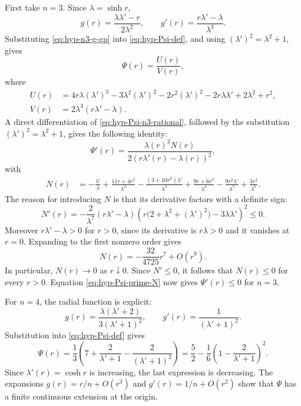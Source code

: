 \documentclass[11pt,reqno]{amsart}
\numberwithin{equation}{section}
\theoremstyle{definition}
\begin{document}
First take $n=3$.  Since $\lambda=\sinh r$,
\begin{equation}\label{eq:hyp-n3-g-gp}
    g(r)=\frac{\lambda\lambda'-r}{2\lambda^2},
    \qquad
    g'(r)=\frac{r\lambda'-\lambda}{\lambda^3}.
\end{equation}
Substituting \eqref{eq:hyp-n3-g-gp} into \eqref{eq:hyp-Psi-def}, and using $(\lambda')^2=\lambda^2+1$, gives
\begin{equation}\label{eq:hyp-Psi-n3-rational}
    \Psi(r)=\frac{U(r)}{V(r)},
\end{equation}
where
\begin{align*}
    U(r)&=4r\lambda(\lambda')^3-3\lambda^2(\lambda')^2
          -2r^2(\lambda')^2-2r\lambda\lambda'+2\lambda^2+r^2,
          \\
    V(r)&=2\lambda^3(r\lambda'-\lambda).
\end{align*}
A direct differentiation of \eqref{eq:hyp-Psi-n3-rational}, followed by the substitution $(\lambda')^2=\lambda^2+1$, gives the following identity:
\begin{equation}\label{eq:hyp-Psi-prime-N}
    \Psi'(r)=\frac{\lambda(r)^2N(r)}{2(r\lambda'(r)-\lambda(r))^2},
\end{equation}
with
\begin{align*}
    N(r)&=-\frac{\lambda'}{\lambda}
       +\frac{11r+4r^3}{\lambda^2}
       -\frac{(3+10r^2)\lambda'}{\lambda^3}
       +\frac{9r+6r^3}{\lambda^4}
       -\frac{9r^2\lambda'}{\lambda^5}
       +\frac{3r^3}{\lambda^6}.
\end{align*}
The reason for introducing $N$ is that its derivative factors with a definite sign:
\begin{equation*}
    N'(r)=
    -\frac{2}{\lambda^7}(r\lambda'-\lambda)
      \left(r\bigl(2+\lambda^2+(\lambda')^2\bigr)-3\lambda\lambda'\right)^2
      \leq0.
\end{equation*}
Moreover $r\lambda'-\lambda>0$ for $r>0$, since its derivative is $r\lambda>0$ and it vanishes at $r=0$.  Expanding to the first nonzero order gives
\begin{equation*}
    N(r)=-\frac{32}{4725}r^7+O(r^9).
\end{equation*}
In particular, $N(r)\to0$ as $r\downarrow0$.  Since $N'\leq0$, it follows that $N(r)\leq0$ for every $r>0$.  Equation \eqref{eq:hyp-Psi-prime-N} now gives $\Psi'(r)\leq0$ for $n=3$.

For $n=4$, the radial function is explicit:
\begin{equation*}
    g(r)=\frac{\lambda(\lambda'+2)}{3(\lambda'+1)^2},
    \qquad
    g'(r)=\frac{1}{(\lambda'+1)^2}.
\end{equation*}
Substitution into \eqref{eq:hyp-Psi-def} gives
\begin{equation*}
    \Psi(r)=\frac13\left(7+\frac{2}{\lambda'+1}
          -\frac{2}{(\lambda'+1)^2}\right)
       =\frac52-\frac16\left(1-\frac{2}{\lambda'+1}\right)^2.
\end{equation*}
Since $\lambda'(r)=\cosh r$ is increasing, the last expression is decreasing.  The expansions $g(r)=r/n+O(r^3)$ and $g'(r)=1/n+O(r^2)$ show that $\Psi$ has a finite continuous extension at the origin.
\end{document}
